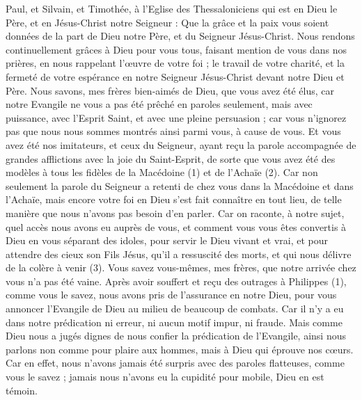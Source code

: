 \BFont
\begin{multicols}{2}
\VerseOne{}Paul, et Silvain, et Timothée, à l'Eglise des Thessaloniciens qui est en Dieu le Père, et en Jésus-Christ notre Seigneur : Que la grâce et la paix vous soient données de la part de Dieu notre Père, et du Seigneur Jésus-Christ.
Nous rendons continuellement grâces à Dieu pour vous tous, faisant mention de vous dans nos prières,
en nous rappelant l’œuvre de votre foi ; le travail de votre charité, et la fermeté de votre espérance en notre Seigneur Jésus-Christ devant notre Dieu et Père.
Nous savons, mes frères bien-aimés de Dieu, que vous avez été élus,
car notre Evangile ne vous a pas été prêché en paroles seulement, mais avec puissance, avec l’Esprit Saint, et avec une pleine persuasion ; car vous n’ignorez pas que nous nous sommes montrés ainsi parmi vous, à cause de vous.
Et vous avez été nos imitateurs, et ceux du Seigneur, ayant reçu la parole accompagnée de grandes afflictions avec la joie du Saint-Esprit,
de sorte que vous avez été des modèles à tous les fidèles de la Macédoine (1) et de l’Achaïe (2).
Car non seulement la parole du Seigneur a retenti de chez vous dans la Macédoine et dans l'Achaïe, mais encore votre foi en Dieu s’est fait connaître en tout lieu, de telle manière que nous n’avons pas besoin d’en parler.
Car on raconte, à notre sujet, quel accès nous avons eu auprès de vous, et comment vous vous êtes convertis à Dieu en vous séparant des idoles, pour servir le Dieu vivant et vrai,
et pour attendre des cieux son Fils Jésus, qu'il a ressuscité des morts, et qui nous délivre de la colère à venir (3).
\VerseOne{}Vous savez vous-mêmes, mes frères, que notre arrivée chez vous n'a pas été vaine.
Après avoir souffert et reçu des outrages à Philippes (1), comme vous le savez, nous avons pris de l’assurance en notre Dieu, pour vous annoncer l’Evangile de Dieu au milieu de beaucoup de combats.
Car il n’y a eu dans notre prédication ni erreur, ni aucun motif impur, ni fraude.
Mais comme Dieu nous a jugés dignes de nous confier la prédication de l'Evangile, ainsi nous parlons non comme pour plaire aux hommes, mais à Dieu qui éprouve nos cœurs.
Car en effet, nous n’avons jamais été surpris avec des paroles flatteuses, comme vous le savez ; jamais nous n’avons eu la cupidité pour mobile, Dieu en est témoin.

\end{multicols}
